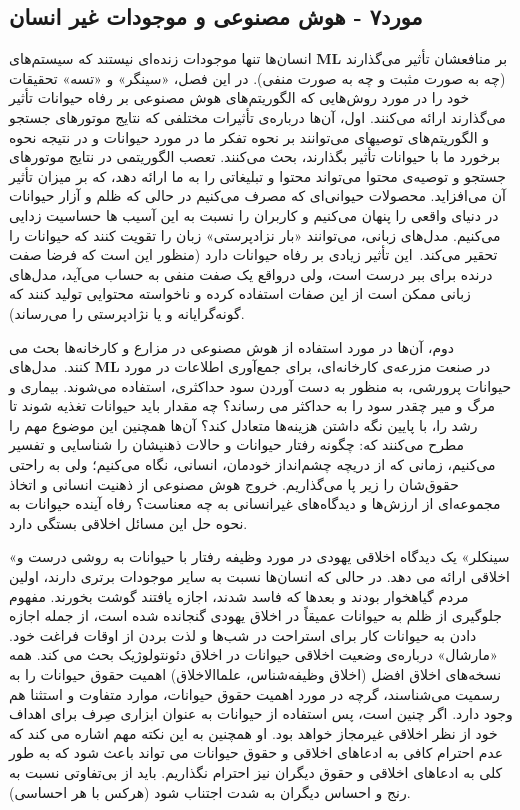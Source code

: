 \documentclass[12pt,oneside]{book}
\begin{document}
    \subsection*{مورد۷ - هوش مصنوعی و موجودات غیر انسان}
    انسان‌ها تنها موجودات زنده‌ای نیستند که سیستم‌های \textenglish{\textbf{ML}} بر منافعشان تأثیر می‌گذارند (چه به صورت مثبت و چه به صورت منفی).
    در این فصل، «سینگر» و «تسه» تحقیقات خود را در مورد روش‌هایی که الگوریتم‌های هوش مصنوعی بر رفاه حیوانات تأثیر می‌گذارند ارائه می‌کنند.
    اول، آن‌ها درباره‌ی تأثیرات مختلفی که نتایج موتورهای جستجو و الگوریتم‌های توصیهای می‌توانند بر نحوه تفکر ما در مورد حیوانات و در نتیجه نحوه برخورد ما با حیوانات تأثیر بگذارند، بحث می‌کنند.
    تعصب الگوریتمی در نتایج موتورهای جستجو و توصیه‌ی محتوا می‌تواند محتوا و تبلیغاتی را به ما ارائه دهد، که بر میزان تأثیر آن می‌افزاید.
    محصولات حیوانی‌ای که مصرف می‌کنیم در حالی که ظلم و آزار حیوانات در دنیای واقعی را پنهان می‌کنیم و کاربران را نسبت به این آسیب ها حساسیت زدایی می‌کنیم.
    مدل‌های زبانی، می‌توانند «بار نزادپرستی» زبان را تقویت کنند که حیوانات را تحقیر می‌کند.\     این تأثیر زیادی بر رفاه حیوانات دارد (منظور این است که فرضا صفت درنده برای ببر درست است، ولی درواقع یک صفت منفی به حساب می‌آید، مدل‌های زبانی ممکن است از این صفات استفاده کرده و ناخواسته محتوایی تولید کنند که گونه‌گرایانه و یا نژادپرستی را می‌رساند).

    دوم، آن‌ها در مورد استفاده از هوش مصنوعی در مزارع و کارخانه‌ها بحث می کنند.\     مدل‌های \textenglish{\textbf{ML}} در صنعت مزرعه‌ی کارخانه‌ای، برای جمع‌آوری اطلاعات در مورد حیوانات پرورشی، به منظور به دست آوردن سود حداکثری، استفاده می‌شوند.
    بیماری و مرگ و میر چقدر سود را به حداکثر می رساند؟ چه مقدار باید حیوانات تغذیه شوند تا رشد را، با پایین نگه داشتن هزینه‌ها متعادل کند؟ آن‌ها همچنین این موضوع مهم را مطرح می‌کنند که: چگونه رفتار حیوانات و حالات ذهنیشان را شناسایی و تفسیر می‌کنیم، زمانی که از دریچه چشم‌انداز خودمان، انسانی، نگاه می‌کنیم؛ ولی به راحتی حقوق‌شان را زیر پا می‌گذاریم.
    خروج هوش مصنوعی از ذهنیت انسانی و اتخاذ مجموعه‌ای از ارزش‌ها و دیدگاه‌های غیرانسانی به چه معناست؟ رفاه آینده حیوانات به نحوه حل این مسائل اخلاقی بستگی دارد.

    «سینکلر» یک دیدگاه اخلاقی یهودی در مورد وظیفه رفتار با حیوانات به روشی درست و اخلاقی ارائه می دهد.
    در حالی که انسان‌ها نسبت به سایر موجودات برتری دارند، اولین مردم گیاهخوار بودند و بعدها که فاسد شدند، اجازه یافتند گوشت بخورند.
    مفهوم جلوگیری از ظلم به حیوانات عمیقاً در اخلاق یهودی گنجانده شده است، از جمله اجازه دادن به حیوانات کار برای استراحت در شب‌ها و لذت بردن از اوقات فراغت خود.
    «مارشال» درباره‌ی وضعیت اخلاقی حیوانات در اخلاق دئونتولوژیک بحث می کند.
    همه نسخه‌های اخلاق افضل (اخلاق وظیفه‌شناس، علماالاخلاق) اهمیت حقوق حیوانات را به رسمیت می‌شناسند، گرچه در مورد اهمیت حقوق حیوانات، موارد متفاوت و استثنا هم وجود دارد.
    اگر چنین است، پس استفاده از حیوانات به عنوان ابزاری صِرف برای اهداف خود از نظر اخلاقی غیرمجاز خواهد بود.
    او همچنین به این نکته مهم اشاره می کند که عدم احترام کافی به ادعاهای اخلاقی و حقوق حیوانات می تواند باعث شود که به طور کلی به ادعاهای اخلاقی و حقوق دیگران نیز احترام نگذاریم.
    باید از بی‌تفاوتی نسبت به رنج و احساس دیگران به شدت اجتناب شود (هرکس با هر احساسی).
\end{document}
